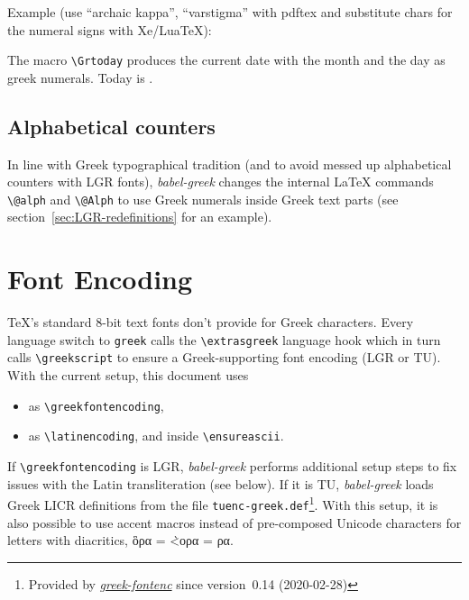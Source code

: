 \documentclass[a4paper]{article}
\newcommand{\file}{\texttt}
\newcommand{\cs}[1]{\texttt{\textbackslash#1}}
\newcommand{\pkgref}[1]{\emph{\href{https://ctan.org/pkg/#1}{#1}}}
\begin{document}
\ifdefined \greeknumeralsix
  Example (use ``archaic kappa'', ``varstigma'' with pdftex and substitute
  chars for the numeral signs with Xe/LuaTeX):
  \renewcommand*{\greeknumeralninety}{\textqoppa}
  \renewcommand*{\greeknumeralNinety}{\textQoppa}
  \ifdefined\UnicodeEncodingName
    \renewcommand*{\textdexiakeraia}{\textquoteright}
    \renewcommand*{\textaristerikeraia}{\quotesinglbase}
  \else
    \renewcommand*{\greeknumeralSix}{\textvarstigma}
  \fi



  The macro \verb|\Grtoday| produces the current date with the month
  and the day as greek numerals. Today is \ensuregreek{\Grtoday}.

  \subsection{Alphabetical counters}

  In line with Greek typographical tradition (and to avoid messed up
  alphabetical counters with LGR fonts), \emph{babel-greek} changes
  the internal LaTeX commands \cs{@alph} and \cs{@Alph}
  to use Greek numerals inside Greek text parts
  (see section~\ref{sec:LGR-redefinitions} for an example).

\fi

\section{Font Encoding}

TeX's standard 8-bit text fonts don't provide for Greek characters.
Every language switch to \texttt{greek} calls the \verb|\extrasgreek|
language hook which in turn calls \verb|\greekscript| to ensure a
Greek-supporting font encoding (LGR or TU).
With the current setup, this document uses
\begin{itemize}
  \item \greekfontencoding{} as \verb|\greekfontencoding|,
  \item \latinencoding{} as \verb|\latinencoding|, and
        \makeatletter \ensureascii{\cf@encoding} \makeatother
        inside \verb|\ensureascii|.
\end{itemize}

If \verb|\greekfontencoding| is LGR, \emph{babel-greek} performs additional
setup steps to fix issues with the Latin transliteration (see below).
If it is TU, \emph{babel-greek} loads Greek LICR definitions from the file
\file{tuenc-greek.def}\footnote{%
    Provided by \pkgref{greek-fontenc} since version~0.14 (2020-02-28)}.
\ifdefined\UnicodeEncodingName
  \expandafter\ifx\greekfontencoding\UnicodeEncodingName
    With this setup, it is also possible to use accent macros instead of
    pre-composed Unicode characters for letters with diacritics,
    ὃρα = \`<ορα = ρα.
  \fi
\fi
\end{document}
